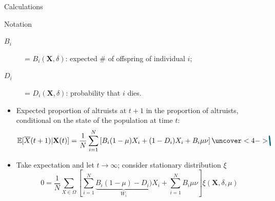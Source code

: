 \documentclass[aspectratio=169]{beamer}
\begin{document}
\begin{frame}{Calculations}
\begin{block}{Notation}
\begin{description}
\item[$B_i$] = $B_i(\mathbf{X}, \delta)$: expected \# of offspring of individual $i$;
\item[$D_i$] = $D_i(\mathbf{X}, \delta)$: probability that $i$ dies.
\end{description}
\end{block}
\pause
\begin{itemize}[<+->]
\item Expected proportion of altruists at $t+1$ in the proportion of altruists, conditional on the state of the population at time $t$:
%
\begin{displaymath}
\tikzmark{E1}\mathbb{E}[\overline{X}(t+1)|\mathbf{X}(t)]\tikzmark{E2} = \frac{1}{N}\sum_{i=1}^N \left[ B_i (1-\mu) X_i + (\tikzmark{O1}1\tikzmark{O2}-D_i)X_i + B_i \mu \nu \right] \uncover<4->{
\tikzstyle{stro}=[maincol, line width=1.5pt, line cap=round]
\tikz[remember picture, overlay]{ \draw[stro] (E1.north west)++(0,0.2) --(E2.south east);
\draw[stro] (O1.north west)++(0,0.2) --(O2.south east);
 }
}
\end{displaymath}

\item Take expectation and let $t\to \infty$; consider stationary distribution $\xi$
%
\begin{displaymath}
0 = \frac{1}{N} \sum_{X \in \Omega}\left[ \sum_{i=1}^N \underbrace{B_i (1-\mu) - D_i)}_{W_i} X_i + \sum_{i=1}^N B_i \mu \nu \right]\xi(\mathbf{X}, \delta, \mu)
\end{displaymath}
\end{itemize}
\end{frame}
\end{document}
